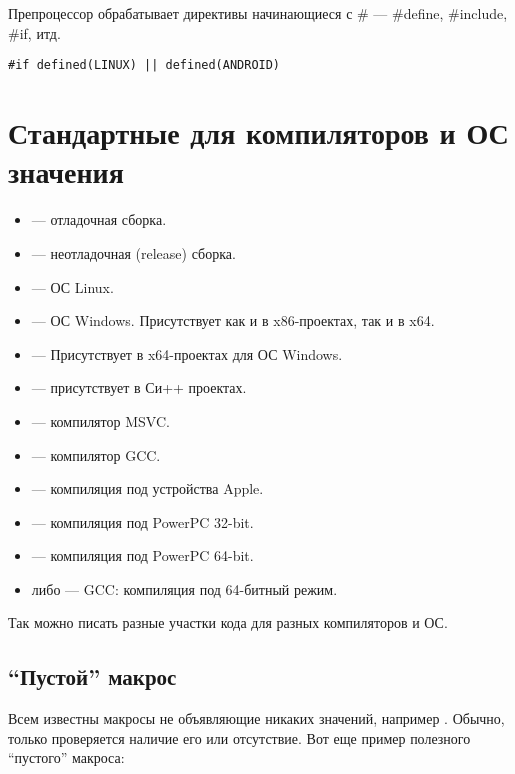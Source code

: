 ﻿\section{}

Препроцессор обрабатывает директивы начинающиеся с \# --- \#define, \#include, \#if, итд.

\begin{lstlisting}[caption=``или'']
#if defined(LINUX) || defined(ANDROID)
\end{lstlisting}

\section{Стандартные для компиляторов и ОС значения}

\begin{itemize}
\item {} --- отладочная сборка.
\item {} --- неотладочная (release) сборка.
\item {} --- ОС Linux.
\item {} --- ОС Windows. Присутствует как и в x86-проектах, так и в x64.
\item {} --- Присутствует в x64-проектах для ОС Windows.
\item {} --- присутствует в Си++ проектах.
\item {} --- компилятор MSVC.
\item {} --- компилятор GCC.
\item {} --- компиляция под устройства Apple.
\item {} --- компиляция под PowerPC 32-bit.
\item {} --- компиляция под PowerPC 64-bit.
\item {} либо  --- GCC: компиляция под 64-битный режим.
\end{itemize}

Так можно писать разные участки кода для разных компиляторов и ОС.

\subsection{``Пустой'' макрос}

Всем известны макросы не объявляющие никаких значений, например .
Обычно, только проверяется наличие его или отсутствие.
Вот еще пример полезного ``пустого'' макроса:

